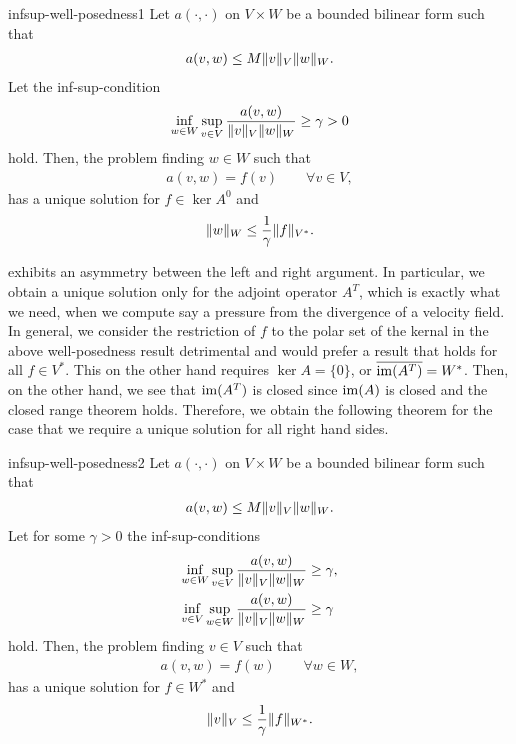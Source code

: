 \begin{Corollary}{infsup-well-posedness1}
  Let $a(\cdot,\cdot)$ on $V\times W$ be a bounded bilinear form such that
  \begin{gather}
    a(v,w) \le M \lVert v\rVert_V \lVert w\rVert_W.
  \end{gather}
  Let the inf-sup-condition
  \begin{gather*}
    \inf_{w\in W}\sup_{v\in V}
    \frac{a(v,w)}{\lVert v\rVert_V\lVert w\rVert_W}
    \ge \gamma > 0    
  \end{gather*}
  hold.  Then, the problem finding $w\in W$ such that
  \begin{gather*}
    a(v,w) = f(v) \qquad\forall v\in V,
  \end{gather*}
  has a unique solution for $f\in \ker A^0$ and
  \begin{gather}
    \lVert w\rVert_W \le \frac1\gamma \lVert f\rVert_{V^*}.
  \end{gather}
\end{Corollary}

\begin{remark}
   exhibits an asymmetry
  between the left and right argument. In particular, we obtain a
  unique solution only for the adjoint operator $A^T$, which is
  exactly what we need, when we compute say a pressure from the
  divergence of a velocity field. In general, we consider the
  restriction of $f$ to the polar set of the kernal in the above
  well-posedness result detrimental and would prefer a result that
  holds for all $f\in V^*$. This on the other hand requires
  $\ker A=\{0\}$, or $\overline{\operatorname{im}(A^T)} = W^*$. Then, on the
  other hand, we see that $\operatorname{im}(A^T)$ is closed since $\operatorname{im}(A)$ is
  closed and the closed range theorem holds. Therefore, we obtain the
  following theorem for the case that we require a unique solution for
  all right hand sides.
\end{remark}

\begin{Theorem}{infsup-well-posedness2}
  Let $a(\cdot,\cdot)$ on $V\times W$ be a bounded bilinear form such that
  \begin{gather}
    a(v,w) \le M \lVert v\rVert_V \lVert w\rVert_W.
  \end{gather}
  Let for some $\gamma>0$ the inf-sup-conditions
  \begin{align*}
    \inf_{w\in W}\sup_{v\in V}
    \frac{a(v,w)}{\lVert v\rVert_V\lVert w\rVert_W}
    &\ge \gamma,\\
    \inf_{v\in V}\sup_{w\in W}
    \frac{a(v,w)}{\lVert v\rVert_V\lVert w\rVert_W}
    &\ge \gamma
  \end{align*}
  hold.  Then, the problem finding $v\in V$ such that
  \begin{gather*}
    a(v,w) = f(w) \qquad\forall w\in W,
  \end{gather*}
  has a unique solution for $f\in W^*$ and
  \begin{gather}
    \lVert v\rVert_V \le \frac1\gamma \lVert f\rVert_{W^*}.
  \end{gather}  
\end{Theorem}

